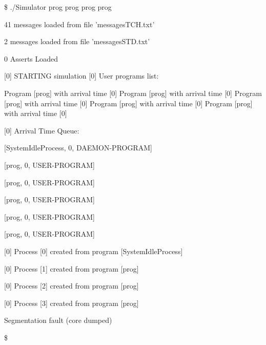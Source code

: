 \$ ./Simulator prog prog prog prog

  41 messages loaded from file 'messagesTCH.txt'

2 messages loaded from file 'messagesSTD.txt'

0 Asserts Loaded

[\textcolor{termred}{0}] 
\textcolor{termred}{STARTING simulation
}
[\textcolor{termred}{0}] 
User programs list:

	Program [\textcolor{termcyan}{prog}] with arrival time [\textcolor{termcyan}{0}]
	Program [\textcolor{termcyan}{prog}] with arrival time [\textcolor{termcyan}{0}]
	Program [\textcolor{termcyan}{prog}] with arrival time [\textcolor{termcyan}{0}]
	Program [\textcolor{termcyan}{prog}] with arrival time [\textcolor{termcyan}{0}]
	Program [\textcolor{termcyan}{prog}] with arrival time [\textcolor{termcyan}{0}]
	
[\textcolor{termred}{0}] 
Arrival Time Queue:

		[\textcolor{termgreen}{SystemIdleProcess}, \textcolor{termred}{0}, \textcolor{termgreen}{DAEMON-PROGRAM}]

		[\textcolor{termgreen}{prog}, \textcolor{termred}{0}, \textcolor{termgreen}{USER-PROGRAM}]

		[\textcolor{termgreen}{prog}, \textcolor{termred}{0}, \textcolor{termgreen}{USER-PROGRAM}]

		[\textcolor{termgreen}{prog}, \textcolor{termred}{0}, \textcolor{termgreen}{USER-PROGRAM}]

		[\textcolor{termgreen}{prog}, \textcolor{termred}{0}, \textcolor{termgreen}{USER-PROGRAM}]

		[\textcolor{termgreen}{prog}, \textcolor{termred}{0}, \textcolor{termgreen}{USER-PROGRAM}]

	
[\textcolor{termred}{0}] 
\textcolor{termgreen}{Process [0] created from program [SystemIdleProcess]}

	
[\textcolor{termred}{0}] 
\textcolor{termgreen}{Process [1] created from program [prog]}

	
[\textcolor{termred}{0}] 
\textcolor{termgreen}{Process [2] created from program [prog]}

	
[\textcolor{termred}{0}] 
\textcolor{termgreen}{Process [3] created from program [prog]}

Segmentation fault (core dumped)

\$